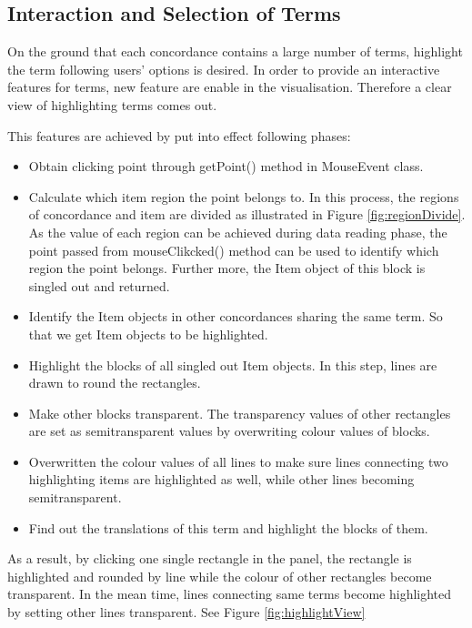 \subsection{Interaction and Selection of Terms}

On the ground that each concordance contains a large number of terms, highlight the term following users' options is desired. In order to provide an interactive features for terms, new feature are enable in the visualisation. Therefore a clear view of highlighting terms comes out. 

This features are achieved by put into effect following phases:
\begin{itemize}
	\item \textbf{} Obtain clicking point through getPoint() method in MouseEvent class.
	\item \textbf{} Calculate which item region the point belongs to. In this process, the regions of concordance and item are divided as illustrated in Figure \ref{fig:regionDivide}. As the value of each region can be achieved during data reading phase, the point passed from mouseClikcked() method can be used to identify which region the point belongs. Further more, the Item object of this block is singled out and returned.
	\item \textbf{} Identify the Item objects in other concordances sharing the same term. So that we get Item objects to be highlighted.
	\item \textbf{} Highlight the blocks of all singled out Item objects. In this step, lines are drawn to round the rectangles. 
	\item \textbf{} Make other blocks transparent. The transparency values of other rectangles are set as  semitransparent values by overwriting colour values of blocks.
	\item \textbf{} Overwritten the colour values of all lines to make sure lines connecting two highlighting items are highlighted as well, while other lines becoming semitransparent.
	\item \textbf{} Find out the translations of this term and highlight the blocks of them.	
\end{itemize}

As a result, by clicking one single rectangle in the panel, the rectangle is highlighted and rounded by line while the colour of other rectangles become transparent. In the mean time, lines connecting same terms become highlighted by setting other lines transparent. See Figure \ref{fig:highlightView}

